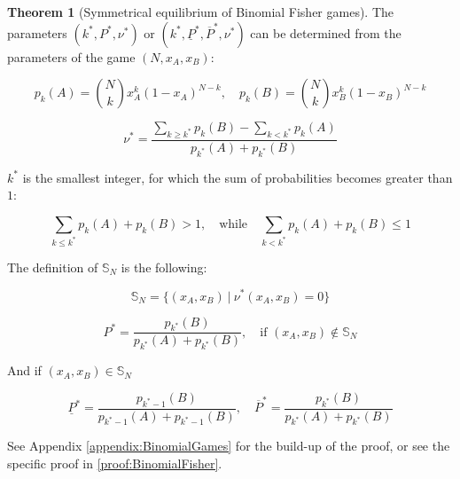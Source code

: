 \documentclass{article}
\theoremstyle{definition}
\newtheorem{theorem}{Theorem}[section]
\begin{document}
\begin{theorem}[Symmetrical equilibrium of Binomial Fisher games]
The parameters $(k^*, P^*, \nu^*)$ or $(k^*, \underline{P}^*, \overline{P}^*, \nu^*)$ can be determined from the parameters of the game $(N, x_A, x_B)$:

\begin{equation}
    \label{eq:BinomialDistribution}
    p_k(A) = \binom{N}{k} x_A^k (1-x_A)^{N-k}, \quad
    p_k(B) = \binom{N}{k} x_B^k (1-x_B)^{N-k}
\end{equation}

\begin{equation}
    \label{thm:SymBinEqNu}
    \nu^* = \frac{\sum_{k \ge k^*} p_k(B) - \sum_{k < k^*} p_k(A)}{p_{k^*}(A)+p_{k^*}(B)}
\end{equation}

$k^*$ is the smallest integer, for which the sum of probabilities becomes greater than $1$:

\begin{equation}
    \label{thm:SymBinEqk}
    \sum_{k \le k^*} p_k(A)+p_k(B) > 1, \quad \mathrm{while} \quad \sum_{k<k^*} p_k(A)+p_k(B) \le 1
\end{equation}

The definition of $\mathbb{S}_N$ is the following:

\begin{equation}
    \label{eq:defOfS_N}
    \mathbb{S}_N = \{(x_A,x_B) \ | \ \nu^*(x_A,x_B) = 0 \}
\end{equation}



\begin{equation}
    \label{eq:SymBinEqP}
    P^* = \frac{p_{k^*}(B)}{p_{k^*}(A)+p_{k^*}(B)}, \quad \text{if } (x_A,x_B) \notin \mathbb{S}_N
\end{equation}

And if $(x_A,x_B) \in \mathbb{S}_N$

\begin{equation}
    \label{eq:SymBinEqPud}
    \underline{P}^* = \frac{p_{k^*-1}(B)}{p_{k^*-1}(A)+p_{k^*-1}(B)}, \quad
    \overline{P}^* = \frac{p_{k^*}(B)}{p_{k^*}(A)+p_{k^*}(B)}
\end{equation}

\end{theorem}

See Appendix \ref{appendix:BinomialGames} for the build-up of the proof, or see the specific proof in \ref{proof:BinomialFisher}.
\end{document}
